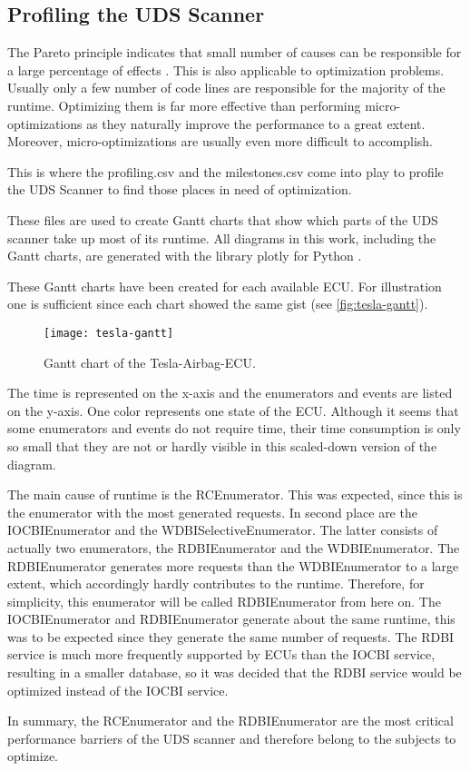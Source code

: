 \subsection{Profiling the UDS Scanner}

The Pareto principle indicates that small number of causes can be responsible for a large percentage of effects \cite{pareto}. This is also applicable to optimization problems. Usually only a few number of code lines are responsible for the majority of the runtime. Optimizing them is far more effective than performing micro-optimizations as they naturally improve the performance to a great extent. Moreover, micro-optimizations are usually even more difficult to accomplish.

This is where the profiling.csv and the milestones.csv come into play to profile the UDS Scanner to find those places in need of optimization.

These files are used to create Gantt charts that show which parts of the UDS scanner take up most of its runtime. All diagrams in this work, including the Gantt charts, are generated with the library plotly for Python \cite{plotly}.

These Gantt charts have been created for each available ECU. For illustration one is sufficient since each chart showed the same gist (see \autoref{fig:tesla-gantt}).

\begin{figure}[h]
    \centering
    \texttt{[image: tesla-gantt]}
    \caption{Gantt chart of the Tesla-Airbag-ECU.}
    \label{fig:tesla-gantt}
\end{figure}

The time is represented on the x-axis and the enumerators and events are listed on the y-axis. One color represents one state of the ECU.
Although it seems that some enumerators and events do not require time, their time consumption is only so small that they are not or hardly visible in this scaled-down version of the diagram.

The main cause of runtime is the RCEnumerator. This was expected, since this is the enumerator with the most generated requests. In second place are the IOCBIEnumerator and the WDBISelectiveEnumerator. The latter consists of actually two enumerators, the RDBIEnumerator and the WDBIEnumerator. The RDBIEnumerator generates more requests than the WDBIEnumerator to a large extent, which accordingly hardly contributes to the runtime. Therefore, for simplicity, this enumerator will be called RDBIEnumerator from here on.
The IOCBIEnumerator and RDBIEnumerator generate about the same runtime, this was to be expected since they generate the same number of requests. The RDBI service is much more frequently supported by ECUs than the IOCBI service, resulting in a smaller database, so it was decided that the RDBI service would be optimized instead of the IOCBI service.

In summary, the RCEnumerator and the RDBIEnumerator are the most critical performance barriers of the UDS scanner and therefore belong to the subjects to optimize.
